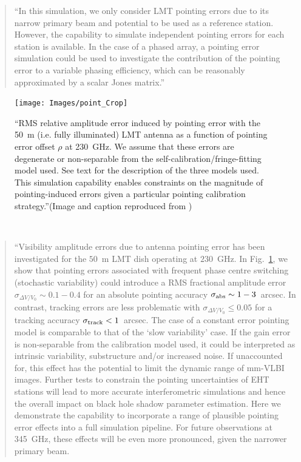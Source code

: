 \begin{quotation}
``In this simulation, we only consider LMT pointing errors due to its narrow primary beam and potential to be used as a reference station. However, the capability to simulate independent pointing errors for each station is available. In the case of a phased array, a pointing error simulation could be used to investigate the contribution of the pointing error to a variable phasing efficiency, which can be reasonably approximated by a scalar Jones matrix.''\\
\citep{Blecher_2016}
\end{quotation}


\begin{figure}[h!]
\texttt{[image: Images/point\_Crop]}
\caption{``RMS relative amplitude error induced by pointing error with the 50~m (i.e. fully illuminated) LMT antenna as a function of pointing error offset $\rho$ at 230~GHz. We assume that these errors are degenerate or non-separable from the self-calibration/fringe-fitting model used. See text for the description of the three models used. This simulation capability enables constraints on the magnitude of pointing-induced errors given a particular pointing calibration strategy.''(Image and caption reproduced from \citet{Blecher_2016})\label{fig:pointing}%
}
\end{figure}
\

\begin{quotation}
``Visibility amplitude errors due to antenna pointing error has been investigated for the $50$~m  LMT dish operating at $230$~GHz. In Fig.~\ref{fig:pointing}, we show that pointing errors associated with frequent phase centre switching (stochastic variability) could introduce a RMS fractional amplitude error $\sigma_{\Delta V/V_0} \sim 0.1 - 0.4$ for an absolute pointing accuracy  $\sigma_{\rm abs} \sim 1-3$~arcsec. In contrast, tracking errors are less problematic with $\sigma_{\Delta V/V_0} \le 0.05$ for a tracking accuracy  $\sigma_{\rm track}<1$~arcsec. The case of a constant error pointing model is comparable to that of the `slow variability' case. If the gain error is non-separable from the calibration model used, it could be interpreted as intrinsic variability, substructure and/or increased noise. If unaccounted for, this effect has the potential to limit the dynamic range of mm-VLBI images. Further tests to constrain the pointing uncertainties of EHT stations will lead to more accurate interferometric simulations and hence the overall impact on black hole shadow parameter estimation. Here we demonstrate the capability to incorporate a range of plausible pointing error effects into a full simulation pipeline. For future observations at 345~GHz, these effects will be even more pronounced, given the narrower primary beam.\\
\citep{Blecher_2016}
\end{quotation}


